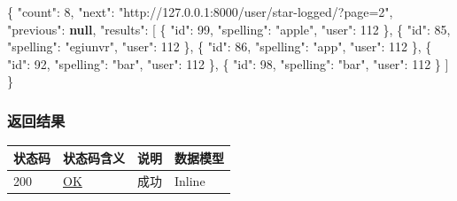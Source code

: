 \documentclass[
]{article}
\newenvironment{Shaded}{}{}
\newcommand{\DataTypeTok}[1]{\textcolor[rgb]{0.56,0.13,0.00}{#1}}
\newcommand{\DecValTok}[1]{\textcolor[rgb]{0.25,0.63,0.44}{#1}}
\newcommand{\FunctionTok}[1]{\textcolor[rgb]{0.02,0.16,0.49}{#1}}
\newcommand{\KeywordTok}[1]{\textcolor[rgb]{0.00,0.44,0.13}{\textbf{#1}}}
\newcommand{\OtherTok}[1]{\textcolor[rgb]{0.00,0.44,0.13}{#1}}
\newcommand{\StringTok}[1]{\textcolor[rgb]{0.25,0.44,0.63}{#1}}
\begin{document}
\begin{Shaded}
\begin{Highlighting}[]
\FunctionTok{\{}
  \DataTypeTok{"count"}\FunctionTok{:} \DecValTok{8}\FunctionTok{,}
  \DataTypeTok{"next"}\FunctionTok{:} \StringTok{"http://127.0.0.1:8000/user/star{-}logged/?page=2"}\FunctionTok{,}
  \DataTypeTok{"previous"}\FunctionTok{:} \KeywordTok{null}\FunctionTok{,}
  \DataTypeTok{"results"}\FunctionTok{:} \OtherTok{[}
    \FunctionTok{\{}
      \DataTypeTok{"id"}\FunctionTok{:} \DecValTok{99}\FunctionTok{,}
      \DataTypeTok{"spelling"}\FunctionTok{:} \StringTok{"apple"}\FunctionTok{,}
      \DataTypeTok{"user"}\FunctionTok{:} \DecValTok{112}
    \FunctionTok{\}}\OtherTok{,}
    \FunctionTok{\{}
      \DataTypeTok{"id"}\FunctionTok{:} \DecValTok{85}\FunctionTok{,}
      \DataTypeTok{"spelling"}\FunctionTok{:} \StringTok{"egiunvr"}\FunctionTok{,}
      \DataTypeTok{"user"}\FunctionTok{:} \DecValTok{112}
    \FunctionTok{\}}\OtherTok{,}
    \FunctionTok{\{}
      \DataTypeTok{"id"}\FunctionTok{:} \DecValTok{86}\FunctionTok{,}
      \DataTypeTok{"spelling"}\FunctionTok{:} \StringTok{"app"}\FunctionTok{,}
      \DataTypeTok{"user"}\FunctionTok{:} \DecValTok{112}
    \FunctionTok{\}}\OtherTok{,}
    \FunctionTok{\{}
      \DataTypeTok{"id"}\FunctionTok{:} \DecValTok{92}\FunctionTok{,}
      \DataTypeTok{"spelling"}\FunctionTok{:} \StringTok{"bar"}\FunctionTok{,}
      \DataTypeTok{"user"}\FunctionTok{:} \DecValTok{112}
    \FunctionTok{\}}\OtherTok{,}
    \FunctionTok{\{}
      \DataTypeTok{"id"}\FunctionTok{:} \DecValTok{98}\FunctionTok{,}
      \DataTypeTok{"spelling"}\FunctionTok{:} \StringTok{"bar"}\FunctionTok{,}
      \DataTypeTok{"user"}\FunctionTok{:} \DecValTok{112}
    \FunctionTok{\}}
  \OtherTok{]}
\FunctionTok{\}}
\end{Highlighting}
\end{Shaded}

\hypertarget{ux8fd4ux56deux7ed3ux679c-28}{%
\subsubsection{返回结果}\label{ux8fd4ux56deux7ed3ux679c-28}}

\begin{longtable}[]{@{}llll@{}}
\toprule
状态码 & 状态码含义 & 说明 & 数据模型 \\
\midrule
\endhead
200 & \href{https://tools.ietf.org/html/rfc7231\#section-6.3.1}{OK} &
成功 & Inline \\
\bottomrule
\end{longtable}
\end{document}
